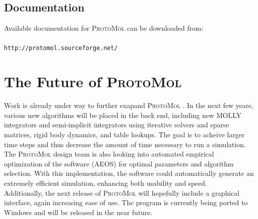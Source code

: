 \documentclass[11pt]{report}
\newcommand{\ProtoMol}{\textsc{ProtoMol }}
\providecommand{\ttsmall}[1]{\texttt{\small\mbox{#1}}}
\begin{document}
\section{Documentation}
Available documentation for \ProtoMol can be downloaded from:\\
\\
\ttsmall{http://protomol.sourceforge.net/}

\chapter{The Future of \ProtoMol}

Work is already under way to further exapand \ProtoMol.  In the next
few years, various new algorithms will be placed in the back end,
including new MOLLY integrators and semi-implicit integrators using iterative solvers and sparse matrices, rigid body dynamics, and table lookups.  The goal is to acheive larger
time steps and thus decrease the amount of time necessary to run a
simulation. \\


The \ProtoMol design team is also looking into automated
empirical optimization of the software (AEOS) for optimal parameters and
algorithm selection.  With this implementation, the software could
automatically generate an extremely efficient simulation, enhancing both
usability and speed. \\

Additionally, the next release of \ProtoMol will hopefully
include a graphical interface, again increasing ease of use.  The
program is currently being ported to Windows and will be released in the
near future.
\end{document}
